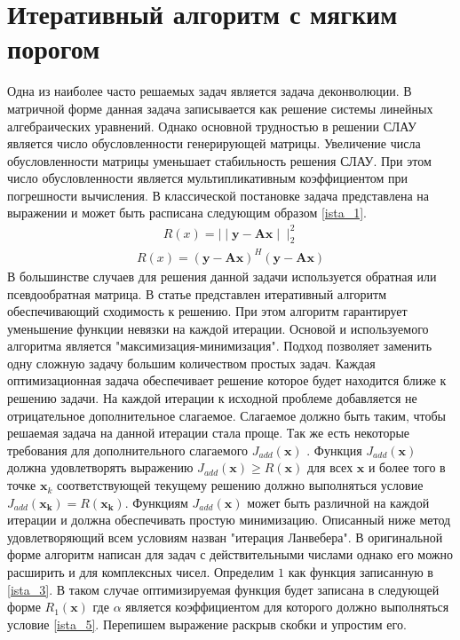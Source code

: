 \section{Итеративный алгоритм с мягким порогом}
Одна из наиболее часто решаемых задач является задача деконволюции. В матричной форме данная задача записывается как решение системы линейных алгебраических уравнений. Однако основной трудностью в решении СЛАУ является число обусловленности генерирующей матрицы\cite{Book66}. Увеличение числа обусловленности матрицы уменьшает стабильность решения СЛАУ. При этом число обусловленности является мультипликативным коэффициентом при погрешности вычисления\cite{Book55}. В классической постановке задача представлена на выражении \cite{Book51} и может быть расписана следующим образом \eqref{ista_1}\cite{Book49}.
\begin{align}
R(x)=\mid\mid\mathbf{y}-\mathbf{Ax}\mid\mid^2_2 
\label{ista_1}
\end{align}
\begin{align}
R(x)=(\mathbf{y}-\mathbf{Ax})^H(\mathbf{y}-\mathbf{Ax})
\label{ista_2}
\end{align}
 В большинстве случаев для решения данной задачи используется обратная или псевдообратная матрица. В статье \cite{Book27} представлен итеративный алгоритм обеспечивающий сходимость к решению. При этом алгоритм гарантирует уменьшение функции невязки на каждой итерации. Основой и используемого алгоритма является "максимизация-минимизация". Подход позволяет заменить одну сложную задачу большим количеством простых задач. Каждая оптимизационная задача обеспечивает решение которое будет  находится ближе к решению задачи. На каждой итерации к исходной проблеме добавляется не отрицательное дополнительное слагаемое. Слагаемое должно быть таким, чтобы решаемая задача на данной итерации стала проще\cite{Book26}. Так же есть некоторые требования для дополнительного слагаемого $J_{add}(\mathbf{x})$ . Функция $J_{add}(\mathbf{x})$ должна удовлетворять выражению  $J_{add}(\mathbf{x})\geq R(\mathbf{x})$ для всех $\mathbf{x}$  и более того в точке $\mathbf{x}_k$ соответствующей текущему решению должно выполняться условие $J_{add}(\mathbf{x_k})= R(\mathbf{x_k})$.  Функциям $J_{add}(\mathbf{x})$ может быть различной на каждой итерации и должна обеспечивать простую минимизацию. Описанный ниже метод удовлетворяющий всем условиям назван "итерация  Ланвебера"\cite{Book24}. В оригинальной форме алгоритм написан для задач с действительными числами однако его можно расширить и для комплексных чисел. Определим $1$ как функция записанную в \eqref{ista_3}. В таком случае оптимизируемая функция будет записана в следующей форме $ R_1(\mathbf{x})$ \cite{Book28} где $\alpha$ является коэффициентом для которого должно выполняться условие \eqref{ista_5}. Перепишем выражение раскрыв скобки и упростим его.
 
